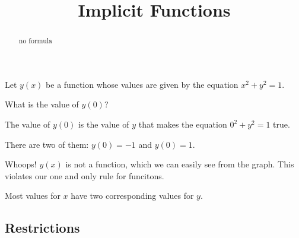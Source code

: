 \documentclass{ximera}
\title{Implicit Functions}
\begin{document}
\begin{abstract}
no formula
\end{abstract}
\maketitle






Let $y(x)$ be a function whose values are given by the equation $x^2 + y^2 = 1$.

What is the value of $y(0)$? 

The value of $y(0)$ is the value of $y$ that makes the equation $0^2 + y^2 = 1$ true. 

There are two of them: $y(0) = -1$ and $y(0) = 1$. 


Whoops!  $y(x)$ is not a function, which we can easily see from the graph. This violates our one and only rule for funcitons.






\begin{image}
\end{image}


Most values for $x$ have two corresponding values for $y$. 







\subsection*{Restrictions}
\end{document}
